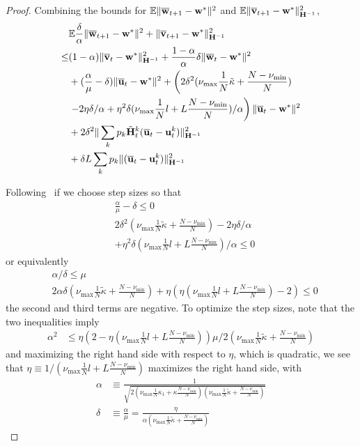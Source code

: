 \begin{proof}
	Combining the bounds for $\mathbb{E}\|{\overline{\mathbf{w}}}_{t+1}-{\mathbf{w}}^{\ast}\|^{2}$
	and $\mathbb{E}\|{\overline{\mathbf{v}}}_{t+1}-{\mathbf{w}}^{\ast}\|_{{\mathbf{H}}^{-1}}^{2}$, 
	\begin{align*}
	& \mathbb{E}\frac{\delta}{\alpha}\|{\overline{\mathbf{w}}}_{t+1}-{\mathbf{w}}^{\ast}\|^{2}+\|{\overline{\mathbf{v}}}_{t+1}-{\mathbf{w}}^{\ast}\|_{{\mathbf{H}}^{-1}}^{2}\\
	\leq&(1-\alpha)\|{\overline{\mathbf{v}}}_{t}-{\mathbf{w}}^{\ast}\|_{{\mathbf{H}}^{-1}}^{2}+\frac{1-\alpha}{\alpha}\delta\|{\overline{\mathbf{w}}}_{t}-{\mathbf{w}}^{\ast}\|^{2}\\
	&+(\frac{\alpha}{\mu}-\delta)\|{\overline{\mathbf{u}}}_{t}-{\mathbf{w}}^{\ast}\|^{2} +\left(2\delta^{2}(\nu_{\max}\frac{1}{N}\tilde{\kappa}+\frac{N-\nu_{\min}}{N})\right.\\
	&\left.-2\eta\delta/\alpha+\eta^{2}\delta(\nu_{\max}\frac{1}{N}l+L\frac{N-\nu_{\min}}{N})/\alpha\right)\|{\overline{\mathbf{u}}}_{t}-{\mathbf{w}}^{\ast}\|^{2}\\
	& +2\delta^{2}\|\sum_{k}p_{k}\tilde{{\mathbf{H}}}_{t}^{k}({\overline{\mathbf{u}}}_{t}-{\mathbf{u}}_{t}^{k})\|_{{\mathbf{H}}^{-1}}^{2}\\
	& +\delta L\sum_{k}p_{k}\|({\overline{\mathbf{u}}}_{t}-{\mathbf{u}}_{t}^{k})\|_{{\mathbf{H}}^{-1}}^{2}
	\end{align*}
	
	Following~\cite{liu2018accelerating} if we choose step sizes so that 
	{\small
	\begin{align*}
	&\frac{\alpha}{\mu}-\delta \leq0\\
	&2\delta^{2}(\nu_{\max}\frac{1}{N}\tilde{\kappa}+\frac{N-\nu_{\min}}{N})-2\eta\delta/\alpha\\
	&+\eta^{2}\delta(\nu_{\max}\frac{1}{N}l+L\frac{N-\nu_{\min}}{N})/\alpha \leq0
	\end{align*}
	}%
	or equivalently 
	{\small
	\begin{align*}
	&\alpha/\delta \leq\mu\\
	&2\alpha\delta(\nu_{\max}\frac{1}{N}\tilde{\kappa}+\frac{N-\nu_{\min}}{N})+\eta(\eta(\nu_{\max}\frac{1}{N}l+L\frac{N-\nu_{\min}}{N})-2) \leq0
	\end{align*}
	}%
	the second and third terms are negative. To optimize the step sizes,
	note that the two inequalities imply 
	{\small
	\begin{align*}
	\alpha^{2} & \leq\eta(2-\eta(\nu_{\max}\frac{1}{N}l+L\frac{N-\nu_{\min}}{N}))\mu/2(\nu_{\max}\frac{1}{N}\tilde{\kappa}+\frac{N-\nu_{\min}}{N})
	\end{align*}
	}%
	and maximizing the right hand side with respect to $\eta$, which
	is quadratic, we see that $\eta\equiv1/(\nu_{\max}\frac{1}{N}l+L\frac{N-\nu_{\min}}{N})$
	maximizes the right hand side, with 
	\begin{align*}
	\alpha & \equiv\frac{1}{\sqrt{2(\nu_{\max}\frac{1}{N}\kappa_{1}+\kappa\frac{N-\nu_{\min}}{N})(\nu_{\max}\frac{1}{N}\tilde{\kappa}+\frac{N-\nu_{\min}}{N})}}\\
	\delta & \equiv\frac{\alpha}{\mu}=\frac{\eta}{\alpha(\nu_{\max}\frac{1}{N}\tilde{\kappa}+\frac{N-\nu_{\min}}{N})}
	\end{align*}
	

\end{proof}
